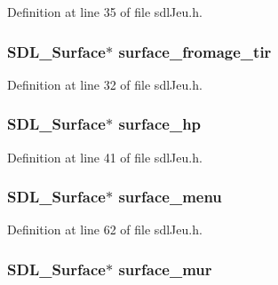 Definition at line 35 of file sdl\-Jeu.\-h.

\hypertarget{structsdl_jeu_a4725423b3638295a6ecc002c96826235}{
\subsubsection[{surface\-\_\-fromage\-\_\-tir}]{\setlength{\rightskip}{0pt plus 5cm}S\-D\-L\-\_\-\-Surface$\ast$ surface\-\_\-fromage\-\_\-tir}}\label{structsdl_jeu_a4725423b3638295a6ecc002c96826235}


Definition at line 32 of file sdl\-Jeu.\-h.

\hypertarget{structsdl_jeu_a9f68bf316a2241185e3c8f8b3d038d85}{
\subsubsection[{surface\-\_\-hp}]{\setlength{\rightskip}{0pt plus 5cm}S\-D\-L\-\_\-\-Surface$\ast$ surface\-\_\-hp}}\label{structsdl_jeu_a9f68bf316a2241185e3c8f8b3d038d85}


Definition at line 41 of file sdl\-Jeu.\-h.

\hypertarget{structsdl_jeu_a29c6542f0f27a5c7d75584b0332818b1}{
\subsubsection[{surface\-\_\-menu}]{\setlength{\rightskip}{0pt plus 5cm}S\-D\-L\-\_\-\-Surface$\ast$ surface\-\_\-menu}}\label{structsdl_jeu_a29c6542f0f27a5c7d75584b0332818b1}


Definition at line 62 of file sdl\-Jeu.\-h.

\hypertarget{structsdl_jeu_a1eae6cdffcfd9a581314a0377e25b825}{
\subsubsection[{surface\-\_\-mur}]{\setlength{\rightskip}{0pt plus 5cm}S\-D\-L\-\_\-\-Surface$\ast$ surface\-\_\-mur}}\label{structsdl_jeu_a1eae6cdffcfd9a581314a0377e25b825}


